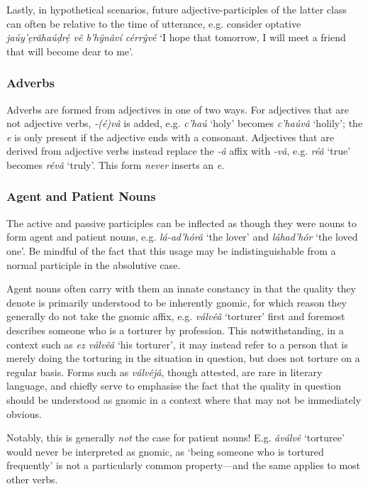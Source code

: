 \documentclass[a4paper, 12pt, twoside, final]{article}
\let \w \textit
\begin{document}
Lastly, in hypothetical scenarios, future adjective-participles of the latter class can often be relative to the time of
utterance, e.g. consider optative \w{jaúy’ẹrâhaúḍrẹ́ vê b’hŷnâví cérrŷvé} ‘I hope that tomorrow, I will meet a friend that
will become dear to me’.

\subsubsection{Adverbs}
Adverbs are formed from adjectives in one of two ways. For adjectives that are not adjective verbs, \w{-(é)vâ} is added,
e.g. \w{c’haú} ‘holy’ becomes \w{c’haúvâ} ‘holily’; the \w{e} is only present if the adjective ends with a consonant. Adjectives that
are derived from adjective verbs instead replace the \w{-â} affix with \w{-vâ}, e.g. \w{réâ} ‘true’ becomes \w{révâ} ‘truly’. This
form \textit{never} inserts an \textit{e}.

\subsubsection{Agent and Patient Nouns}%
The active and passive participles can be inflected as though they were nouns to form agent and
patient nouns, e.g. \w{lá-ad’hórâ} ‘the lover’ and \w{láhad’hór} ‘the loved one’. Be mindful of the fact
that this usage may be indistinguishable from a normal participle in the absolutive case.

Agent nouns often carry with them an innate constancy in that the quality they denote
is primarily understood to be inherently gnomic, for which reason they generally do not take the gnomic affix,
e.g. \w{válvêâ} ‘torturer’ first and foremost describes someone who is a torturer by profession. This notwithstanding,
in a context such as \w{ez válvêâ} ‘his torturer’, it may instead refer to a person that is merely doing the torturing in the
situation in question, but does not torture on a regular basis. Forms such as \w{válvêjâ}, though attested, are rare in
literary language, and chiefly serve to emphasise the fact that the quality in question should be understood as gnomic
in a context where that may not be immediately obvious.

Notably, this is generally \textit{not} the case for patient nouns! E.g. \w{âválvê} ‘torturee’ would never be interpreted
as gnomic, as ‘being someone who is tortured frequently’ is not a particularly common property—and the same applies to
most other verbs.
\end{document}
